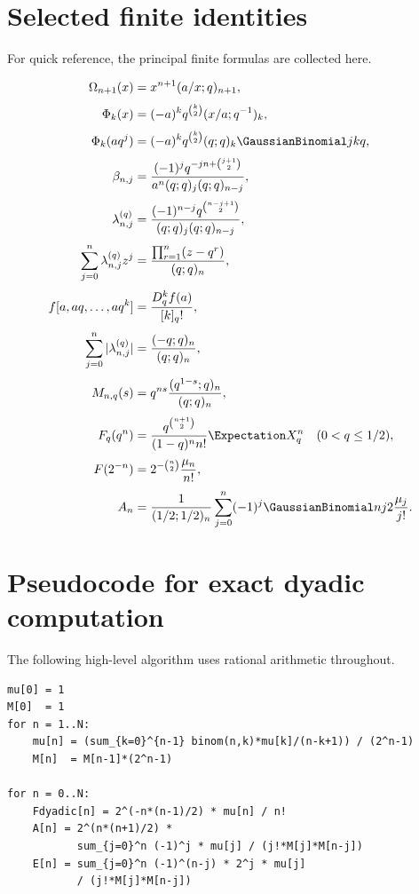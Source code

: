 \documentclass[11pt,a4paper,oneside]{article}
\theoremstyle{definition}
\theoremstyle{remark}
\begin{document}
\section{Selected finite identities}
\label{app:finite-identities}

For quick reference, the principal finite formulas are collected here.

\begin{align*}
 \Omega_{n+1}(x)
 &=x^{n+1}(a/x;q)_{n+1},\\[0.3em]
 \Phi_k(x)
 &=(-a)^kq^{\binom k2}(x/a;q^{-1})_k,\\[0.3em]
 \Phi_k(aq^j)
 &=(-a)^kq^{\binom k2}(q;q)_k\GaussianBinomial jkq,\\[0.3em]
 \beta_{n,j}
 &=\frac{(-1)^jq^{-jn+\binom{j+1}{2}}}
 {a^n(q;q)_j(q;q)_{n-j}},\\[0.3em]
 \lambda_{n,j}^{(q)}
 &=\frac{(-1)^{n-j}q^{\binom{n-j+1}{2}}}
 {(q;q)_j(q;q)_{n-j}},\\[0.3em]
 \sum_{j=0}^n\lambda_{n,j}^{(q)}z^j
 &=\frac{\prod_{r=1}^n(z-q^r)}{(q;q)_n},\\[0.3em]
 f[a,aq,\ldots,aq^k]
 &=\frac{D_q^kf(a)}{[k]_q!},\\[0.3em]
 \sum_{j=0}^n|\lambda_{n,j}^{(q)}|
 &=\frac{(-q;q)_n}{(q;q)_n},\\[0.3em]
 M_{n,q}(s)
 &=q^{ns}\frac{(q^{1-s};q)_n}{(q;q)_n},\\[0.3em]
 F_q(q^n)
 &=\frac{q^{\binom{n+1}{2}}}{(1-q)^nn!}\Expectation X_q^n
 \quad(0<q\le1/2),\\[0.3em]
 F(2^{-n})
 &=2^{-\binom n2}\frac{\mu_n}{n!},\\[0.3em]
 A_n
 &=\frac1{(1/2;1/2)_n}
 \sum_{j=0}^n(-1)^j\GaussianBinomial nj2\frac{\mu_j}{j!}.
\end{align*}

\section{Pseudocode for exact dyadic computation}
\label{app:pseudocode}

The following high-level algorithm uses rational arithmetic throughout.

\begin{lstlisting}[style=pythonstyle]
mu[0] = 1
M[0]  = 1
for n = 1..N:
    mu[n] = (sum_{k=0}^{n-1} binom(n,k)*mu[k]/(n-k+1)) / (2^n-1)
    M[n]  = M[n-1]*(2^n-1)

for n = 0..N:
    Fdyadic[n] = 2^(-n*(n-1)/2) * mu[n] / n!
    A[n] = 2^(n*(n+1)/2) *
           sum_{j=0}^n (-1)^j * mu[j] / (j!*M[j]*M[n-j])
    E[n] = sum_{j=0}^n (-1)^(n-j) * 2^j * mu[j]
           / (j!*M[j]*M[n-j])
\end{lstlisting}
\end{document}
